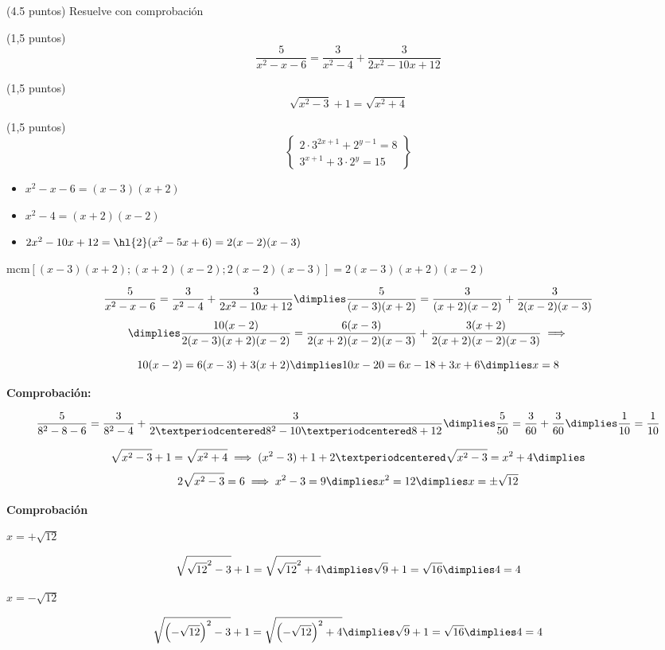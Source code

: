 \documentclass[palatino,nosec]{Docencia}
\begin{document}
\begin{problem} (4.5 puntos)
Resuelve con comprobación

\ppart (1,5 puntos)
\[
	\frac{5}{x^2-x-6} = \frac{3}{x^2-4}+\frac{3}{2x^2-10x+12}
\]

\ppart (1,5 puntos)
\[
	\sqrt{x^2-3} + 1 = \sqrt{x^2+4}
\]

\ppart (1,5 puntos)
\[
\left\{
	\begin{array}{c}
		2·3^{2x+1}+2^{y-1} = 8\\
		3^{x+1}+3·2^y = 15
	\end{array}	
\right\}
\]


\solution

\spart

\begin{itemize}
	\item $x^2-x-6 = (x-3)(x+2)$
	\item $x^2-4 = (x+2)(x-2)$
	\item $2x^2-10x+12 = \text{\hl{2}}(x^2-5x+6) = 2(x-2)(x-3)$
\end{itemize}

$\text{mcm}[(x-3)(x+2);(x+2)(x-2);2(x-2)(x-3)] = 2(x-3)(x+2)(x-2)$

\[
	\frac{5}{x^2-x-6} = \frac{3}{x^2-4}+\frac{3}{2x^2-10x+12} \dimplies
	\frac{5}{(x-3)(x+2)} = \frac{3}{(x+2)(x-2)} + \frac{3}{2(x-2)(x-3)}
\]
\[
\dimplies \frac{10(x-2)}{2(x-3)(x+2)(x-2)} = \frac{6(x-3)}{2(x+2)(x-2)(x-3)} + \frac{3(x+2)}{2(x+2)(x-2)(x-3)} \implies
\]

\[
{10(x-2)} = {6(x-3)} + {3(x+2)} \dimplies 10x-20=6x-18+3x+6 \dimplies x=8
\]

\textbf{Comprobación:}

\[
	\frac{5}{8^2-8-6} = \frac{3}{8^2-4}+\frac{3}{2·8^2-10·8+12} \dimplies
	\frac{5}{50} = \frac{3}{60}+\frac{3}{60} \dimplies \frac{1}{10}=\frac{1}{10}
\]

\spart 

\[
	\sqrt{x^2-3} + 1 = \sqrt{x^2+4} \implies (x^2-3) + 1 + 2·\sqrt{x^2-3} = x^2+4 \dimplies\]
\[
	2\sqrt{x^2-3} = 6 \implies x^2-3 = 9 \dimplies x^2=12 \dimplies x=\pm\sqrt{12}
\]


\textbf{Comprobación}

$x=+\sqrt{12}$

\[
	\sqrt{\sqrt{12}^2-3} + 1 = \sqrt{\sqrt{12}^2+4} \dimplies \sqrt{9}+1=\sqrt{16} \dimplies 4=4
\]


$x=-\sqrt{12}$

\[
	\sqrt{\left(-\sqrt{12}\right)^2-3} + 1 = \sqrt{\left(-\sqrt{12}\right)^2+4} \dimplies \sqrt{9}+1=\sqrt{16} \dimplies 4=4
\]



\end{problem}
\end{document}
